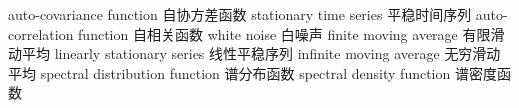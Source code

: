 {auto-covariance function} 
{自协方差函数}
{stationary time series} 
{平稳时间序列}
{auto-correlation function} 
{自相关函数}
{white noise} 
{白噪声}
{finite moving average} 
{有限滑动平均}
{linearly stationary series} 
{线性平稳序列}
{infinite moving average} 
{无穷滑动平均}
{spectral distribution function} 
{谱分布函数}
{spectral density function} 
{谱密度函数}